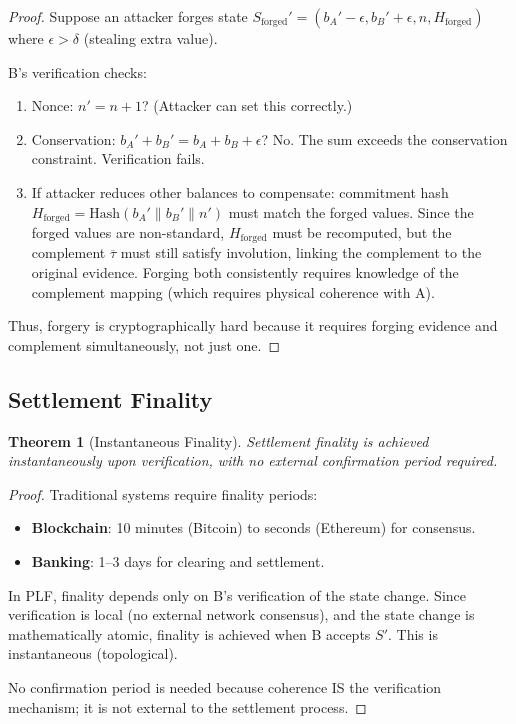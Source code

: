 \documentclass[twocolumn,10pt,a4paper]{article}
\theoremstyle{plain}
\newtheorem{theorem}{Theorem}[section]
\theoremstyle{definition}
\newcommand{\comp}[1]{\overline{#1}}
\begin{document}
\begin{proof}
Suppose an attacker forges state $S_{\text{forged}}' = (b_A' - \epsilon, b_B' + \epsilon, n, H_{\text{forged}})$ where $\epsilon > \delta$ (stealing extra value).

B's verification checks:
\begin{enumerate}
\item Nonce: $n' = n+1$? (Attacker can set this correctly.)
\item Conservation: $b_A' + b_B' = b_A + b_B + \epsilon$? No. The sum exceeds the conservation constraint. Verification fails.
\item If attacker reduces other balances to compensate: commitment hash $H_{\text{forged}} = \mathrm{Hash}(b_A' \| b_B' \| n')$ must match the forged values. Since the forged values are non-standard, $H_{\text{forged}}$ must be recomputed, but the complement $\comp{\tau}$ must still satisfy involution, linking the complement to the original evidence. Forging both consistently requires knowledge of the complement mapping (which requires physical coherence with A).
\end{enumerate}

Thus, forgery is cryptographically hard because it requires forging evidence and complement simultaneously, not just one.
\end{proof}

\subsection{Settlement Finality}

\begin{theorem}[Instantaneous Finality]
Settlement finality is achieved instantaneously upon verification, with no external confirmation period required.
\end{theorem}

\begin{proof}
Traditional systems require finality periods:
\begin{itemize}
\item \textbf{Blockchain}: 10 minutes (Bitcoin) to seconds (Ethereum) for consensus.
\item \textbf{Banking}: 1--3 days for clearing and settlement.
\end{itemize}

In PLF, finality depends only on B's verification of the state change. Since verification is local (no external network consensus), and the state change is mathematically atomic, finality is achieved when B accepts $S'$. This is instantaneous (topological).

No confirmation period is needed because coherence IS the verification mechanism; it is not external to the settlement process.
\end{proof}
\end{document}
